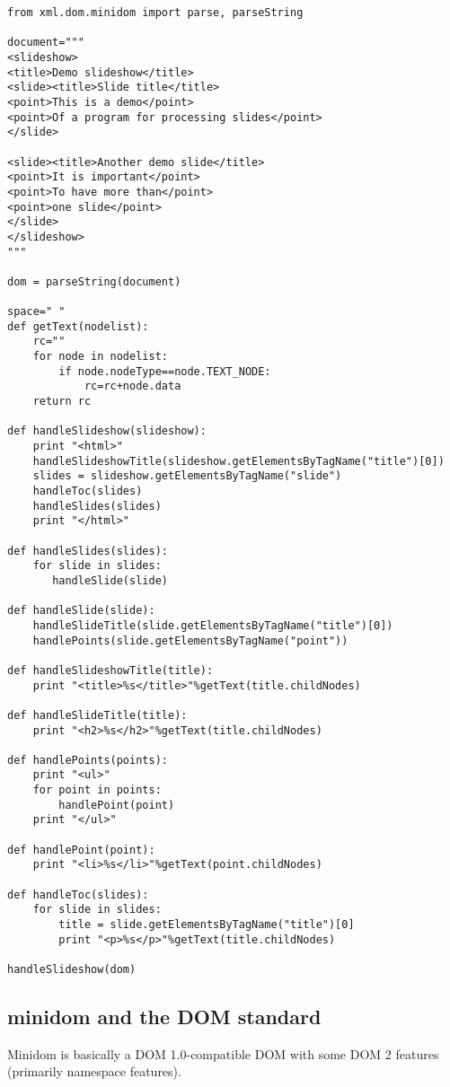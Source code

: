 \begin{verbatim}
from xml.dom.minidom import parse, parseString

document="""
<slideshow>
<title>Demo slideshow</title>
<slide><title>Slide title</title>
<point>This is a demo</point>
<point>Of a program for processing slides</point>
</slide>

<slide><title>Another demo slide</title>
<point>It is important</point>
<point>To have more than</point>
<point>one slide</point>
</slide>
</slideshow>
"""

dom = parseString(document)

space=" "
def getText(nodelist):
    rc=""
    for node in nodelist:
        if node.nodeType==node.TEXT_NODE:
            rc=rc+node.data
    return rc

def handleSlideshow(slideshow):
    print "<html>"
    handleSlideshowTitle(slideshow.getElementsByTagName("title")[0])
    slides = slideshow.getElementsByTagName("slide")
    handleToc(slides)
    handleSlides(slides)
    print "</html>"

def handleSlides(slides):
    for slide in slides:
       handleSlide(slide)

def handleSlide(slide):
    handleSlideTitle(slide.getElementsByTagName("title")[0])
    handlePoints(slide.getElementsByTagName("point"))
    
def handleSlideshowTitle(title):
    print "<title>%s</title>"%getText(title.childNodes)

def handleSlideTitle(title):
    print "<h2>%s</h2>"%getText(title.childNodes)

def handlePoints(points):
    print "<ul>"
    for point in points:
        handlePoint(point)
    print "</ul>"

def handlePoint(point):
    print "<li>%s</li>"%getText(point.childNodes)

def handleToc(slides):
    for slide in slides:
        title = slide.getElementsByTagName("title")[0]
        print "<p>%s</p>"%getText(title.childNodes)
    
handleSlideshow(dom)
\end{verbatim}

\subsection{minidom and the DOM standard \label{minidom-and-dom}}

Minidom is basically a DOM 1.0-compatible DOM with some DOM 2 features
(primarily namespace features). 

